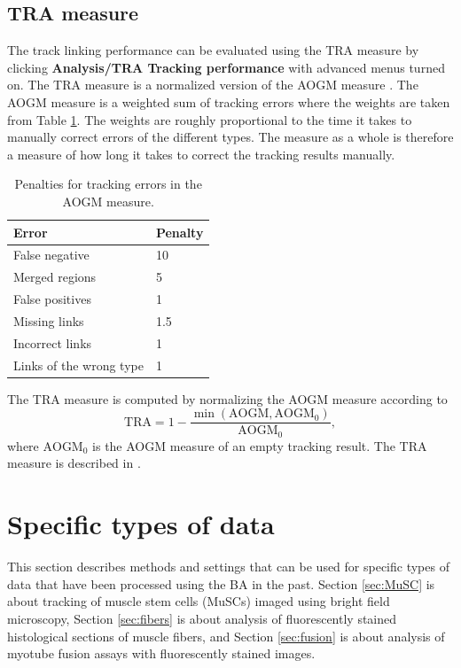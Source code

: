 \documentclass[a4paper, oneside, onecolumn, 11pt]{article}
\newcommand{\menu}[1]{\textbf{#1}}
\begin{document}
\subsection{TRA measure}
The track linking performance can be evaluated using the TRA measure by clicking \menu{Analysis/TRA Tracking performance} with advanced menus turned on. The TRA measure is a normalized version of the AOGM measure \cite{Matula15Accuracy}. The AOGM measure is a weighted sum of tracking errors where the weights are taken from Table \ref{tab:TRA-penalties}. The weights are roughly proportional to the time it takes to manually correct errors of the different types. The measure as a whole is therefore a measure of how long it takes to correct the tracking results manually.

\begin{table}
  \centering
  \caption{Penalties for tracking errors in the AOGM measure.}\label{tab:TRA-penalties}
  \begin{tabular}{ll}
    Error & Penalty \\
    \hline
    False negative & 10 \\
    Merged regions & 5 \\
    False positives & 1 \\
    Missing links & 1.5 \\
    Incorrect links & 1 \\
    Links of the wrong type & 1
  \end{tabular}
\end{table}

The TRA measure is computed by normalizing the AOGM measure according to
\begin{equation}
\text{TRA} = 1 - \frac{\min(\text{AOGM},\text{AOGM}_0)}{\text{AOGM}_0},
\end{equation}
where $\text{AOGM}_0$ is the AOGM measure of an empty tracking result. The TRA measure is described in \cite{Ortiz15Challenge, Ulman17Objective}.

\section{Specific types of data}
This section describes methods and settings that can be used for specific types of data that have been processed using the BA in the past. Section \ref{sec:MuSC} is about tracking of muscle stem cells (MuSCs) imaged using bright field microscopy, Section \ref{sec:fibers} is about analysis of fluorescently stained histological sections of muscle fibers, and Section \ref{sec:fusion} is about analysis of myotube fusion assays with fluorescently stained images.
\end{document}
